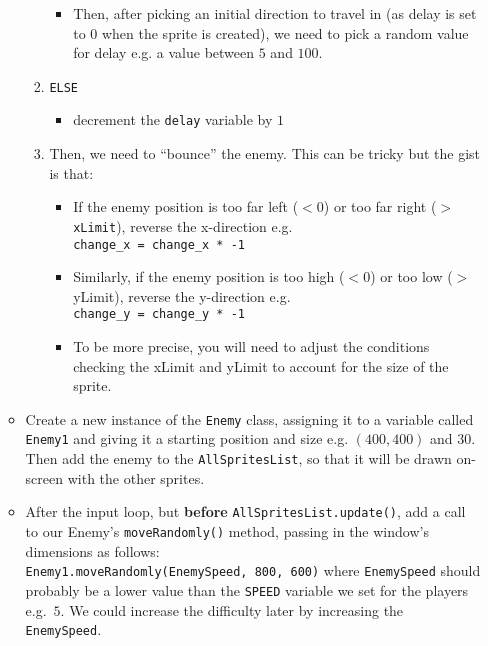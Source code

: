 \documentclass[11pt]{report}
\begin{document}
\begin{enumerate}
\begin{itemize}
\begin{enumerate}
\begin{itemize}
				\item Then, after picking an initial direction to travel in (as delay is set to $0$ when the sprite is created), we need to pick a random value for delay e.g. a value between $5$ and $100$.
			\end{itemize}

			\item {\tt ELSE}

			\begin{itemize}
				\item decrement the {\tt delay} variable by $1$
			\end{itemize}

			\item Then, we need to ``bounce'' the enemy. This can be tricky but the gist is that:

			\begin{itemize}
				\item If the enemy position is too far left ($< 0$) or too far right ($>$ {\tt xLimit}), reverse the x-direction e.g.\\
				{\tt change\_x = change\_x * -1}

				\item Similarly, if the enemy position is too high ($< 0$) or too low ($>$ yLimit), reverse the y-direction e.g.\\
				{\tt change\_y = change\_y * -1}

				\item To be more precise, you will need to adjust the conditions checking the xLimit and yLimit to account for the size of the sprite.
			\end{itemize}

		\end{enumerate}

		\item Create a new instance of the {\tt Enemy} class, assigning it to a variable called {\tt Enemy1} and giving it a starting position and size e.g. $(400, 400)$ and $30$. Then add the enemy to the {\tt AllSpritesList}, so that it will be drawn on-screen with the other sprites.

		\item After the input loop, but \textbf{before} \verb|AllSpritesList.update()|, add a call to our Enemy's {\tt moveRandomly()} method, passing in the window's dimensions as follows:\\
		\verb|Enemy1.moveRandomly(EnemySpeed, 800, 600)|
		where {\tt EnemySpeed} should probably be a lower value than the {\tt SPEED} variable we set for the players e.g.\ $5$. We could increase the difficulty later by increasing the {\tt EnemySpeed}.
	\end{itemize}


\end{enumerate}
\end{document}
